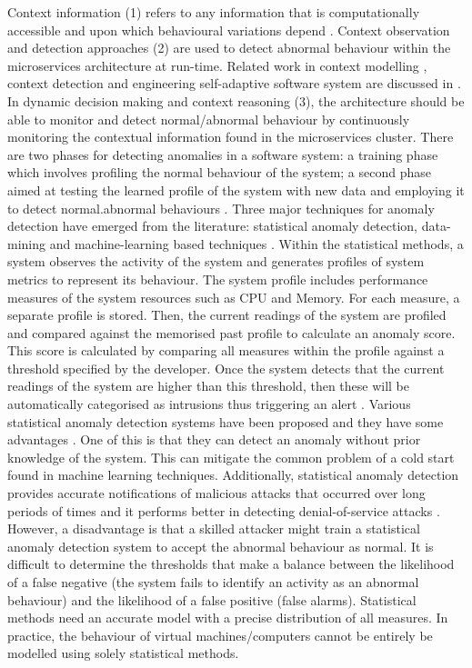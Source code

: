 \documentclass[sigconf]{acmart}
\begin{document}
Context information (1) refers to any information that is computationally accessible and upon which behavioural variations depend \cite{Hirschfeld:2008p1620}. Context observation and detection approaches (2) are used to detect abnormal behaviour within the microservices architecture at run-time. Related work in context modelling \cite{Strang:2004p3770}, context detection and engineering self-adaptive software system are discussed in \cite{Salehie:2009p3693,Cheng:2008p3708,RogeriodeLemos:2011tj}.  
In dynamic decision making and context reasoning (3), the architecture should be able to monitor and detect normal/abnormal behaviour by continuously monitoring the contextual information found in the microservices cluster. There are two phases for detecting anomalies in a software system: a training phase which involves profiling the normal behaviour of the system; a second phase aimed at testing the learned profile of the system with new data and employing it to detect normal.abnormal behaviours \cite{Patcha:2007hja}. Three major techniques for anomaly detection have emerged from the literature: statistical anomaly detection, data-mining and machine-learning based techniques \cite{Patcha:2007hja}. 
Within the statistical methods, a system observes the activity of the system and generates profiles of  system metrics to represent its behaviour. The system profile includes performance measures of the system resources such as CPU and Memory. For each measure, a separate profile is stored. Then, the current readings of the system are profiled and compared against the memorised past profile to calculate an anomaly score. This score is calculated by comparing all measures within the profile against a threshold specified by the developer. Once the system detects that the current readings of the system  are higher than this threshold, then these will be automatically categorised as  intrusions thus triggering an alert \cite{kruegel2003anomaly}. 
Various statistical anomaly detection systems have been proposed and they have some advantages \cite{anderson1995next,roesch1999snort}. 
One of this is that they can detect an anomaly without prior knowledge of the system. This can mitigate the common problem of a cold start found in machine learning techniques. Additionally, statistical anomaly detection provides accurate notifications of malicious attacks that occurred over long periods of times and it performs better in detecting denial-of-service attacks \cite{Patcha:2007hja}. 
However, a disadvantage is that a skilled attacker might train a statistical anomaly detection system to accept the abnormal behaviour as normal. It is difficult to determine the thresholds that make a balance between the likelihood of a false negative (the system fails to identify an activity as an abnormal behaviour) and the likelihood of a false positive (false alarms). Statistical methods need an accurate  model with a precise distribution of all measures. In practice, the behaviour of virtual machines/computers cannot be entirely be modelled using solely statistical methods.
\end{document}
